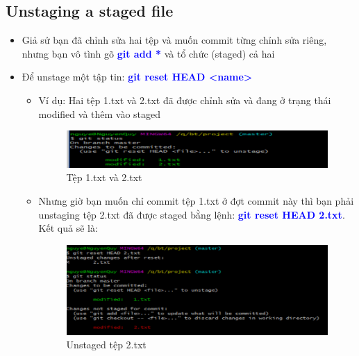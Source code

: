 \documentclass[12pt,a4paper]{report}
\begin{document}
\subsection{Unstaging a staged file}
\begin{itemize}
\item Giả sử bạn đã chỉnh sửa hai tệp và muốn commit từng chỉnh sửa riêng, nhưng bạn vô tình gõ \textcolor{blue}{\bf git add *} và tổ chức (staged) cả hai
\item Để unstage một tập tin: \textcolor{blue}{\bf git reset HEAD <name>}
	\begin{itemize}
\item Ví dụ: Hai tệp 1.txt và 2.txt đã được chỉnh sửa và đang ở trạng thái modified và thêm vào staged

\begin{figure}[!ht]
	\centering
	\includegraphics[width=0.8\linewidth]{screenshot029}
\caption{Tệp 1.txt và 2.txt}
	\label{fig:screenshot029}
	\end{figure}

\item Nhưng giờ bạn muốn chỉ commit tệp 1.txt ở đợt commit này thì bạn phải unstaging tệp 2.txt đã được staged bằng lệnh: \textcolor{blue}{\bf git reset HEAD 2.txt}. Kết quả sẽ là:

\begin{figure}[!ht]
	\centering
	\includegraphics[width=0.8\linewidth]{screenshot030}
\caption{Unstaged tệp 2.txt}
	\label{fig:screenshot030}
	\end{figure}
	
\end{itemize}
\end{itemize}
\end{document}
